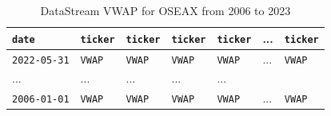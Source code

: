 

\begin{table}[H]
\centering
\begin{tabularx}{\textwidth}{lXXXXXX}
\hline
\texttt{date} & \texttt{ticker} & \texttt{ticker} & \texttt{ticker} & \texttt{ticker} & ... & \texttt{ticker}\\
\hline
\texttt{2022-05-31} & \texttt{VWAP} & \texttt{VWAP} & \texttt{VWAP} & \texttt{VWAP} & ... &  \texttt{VWAP} \\
... & ... & ... & ... & ... \\
\texttt{2006-01-01} & \texttt{VWAP} & \texttt{VWAP} & \texttt{VWAP} & \texttt{VWAP} & ... & \texttt{VWAP}  \\
\hline
\end{tabularx}
\vspace{1em}
\caption{{DataStream VWAP for OSEAX from 2006 to 2023}}
\label{table:datastream-vwap}
\end{table}



